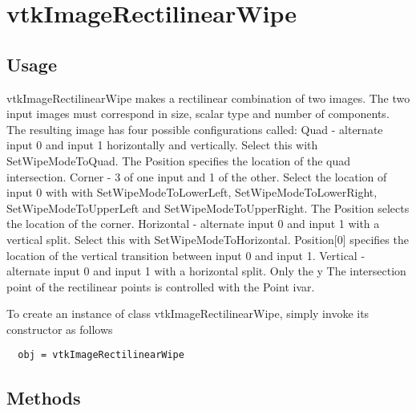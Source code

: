 \section{vtkImageRectilinearWipe}

\subsection{Usage}

 vtkImageRectilinearWipe makes a rectilinear combination of two
 images. The two input images must correspond in size, scalar type and
 number of components.
 The resulting image has four possible configurations
 called:
   Quad - alternate input 0 and input 1 horizontally and
     vertically. Select this with SetWipeModeToQuad. The Position
     specifies the location of the quad intersection.
   Corner - 3 of one input and 1 of the other. Select the location of
     input 0 with with SetWipeModeToLowerLeft, SetWipeModeToLowerRight,
     SetWipeModeToUpperLeft and SetWipeModeToUpperRight. The Position
     selects the location of the corner.
   Horizontal - alternate input 0 and input 1 with a vertical
     split. Select this with SetWipeModeToHorizontal. Position[0]
     specifies the location of the vertical transition between input 0
     and input 1.
   Vertical - alternate input 0 and input 1 with a horizontal
     split. Only the y The intersection point of the rectilinear points
     is controlled with the Point ivar.

To create an instance of class vtkImageRectilinearWipe, simply
invoke its constructor as follows
\begin{verbatim}
  obj = vtkImageRectilinearWipe
\end{verbatim}
\subsection{Methods}

